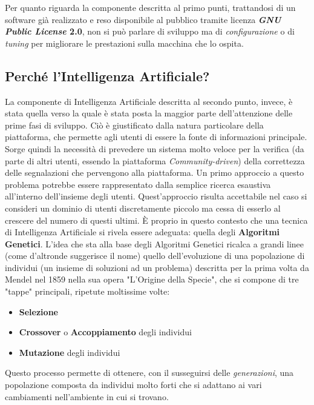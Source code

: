         Per quanto riguarda la componente descritta al primo punti, trattandosi di un software già realizzato e reso disponibile al pubblico tramite licenza \textbf{\textit{GNU Public License} 2.0}, non si può parlare di sviluppo ma di \textit{configurazione} o di \textit{tuning} per migliorare le prestazioni sulla macchina che lo ospita.

        \subsection{Perché l'Intelligenza Artificiale?}
            La componente di Intelligenza Artificiale descritta al secondo punto, invece, è stata quella verso la quale è stata posta la maggior parte dell'attenzione delle prime fasi di sviluppo. Ciò è giustificato dalla natura particolare della piattaforma, che permette agli utenti di essere la fonte di informazioni principale. Sorge quindi la necessità di prevedere un sistema molto veloce per la verifica (da parte di altri utenti, essendo la piattaforma \textit{Community-driven}) della correttezza delle segnalazioni che pervengono alla piattaforma.  Un primo approccio a questo problema potrebbe essere rappresentato dalla semplice ricerca esaustiva all'interno dell'insieme degli utenti. Quest'approccio risulta accettabile nel caso si consideri un dominio di utenti discretamente piccolo ma cessa di esserlo al crescere del numero di questi ultimi. È proprio in questo contesto che una tecnica di Intelligenza Artificiale si rivela essere adeguata: quella degli \textbf{Algoritmi Genetici}. L'idea che sta alla base degli Algoritmi Genetici ricalca a grandi linee (come d'altronde suggerisce il nome) quello dell'evoluzione di una popolazione di individui (un insieme di soluzioni ad un problema) descritta per la prima volta da Mendel nel 1859 nella sua opera "L'Origine della Specie", che si compone di tre "tappe" principali, ripetute moltissime volte:

            \begin{itemize}
                \item \textbf{Selezione}
                \item \textbf{Crossover} o \textbf{Accoppiamento} degli individui 
                \item \textbf{Mutazione} degli individui 
            \end{itemize}

            Questo processo permette di ottenere, con il susseguirsi delle \textit{generazioni}, una popolazione composta da individui molto forti che si adattano ai vari cambiamenti nell'ambiente in cui si trovano.


